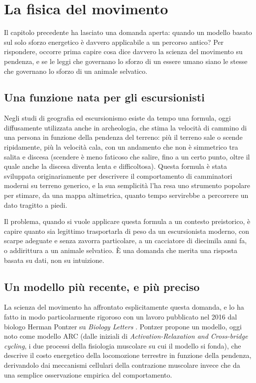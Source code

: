 \chapter{La fisica del movimento}
\label{cap:fisica_movimento}

Il capitolo precedente ha lasciato una domanda aperta: quando un modello basato sul solo sforzo energetico è davvero applicabile a un percorso antico? Per rispondere, occorre prima capire cosa dice davvero la scienza del movimento su pendenza, e se le leggi che governano lo sforzo di un essere umano siano le stesse che governano lo sforzo di un animale selvatico.

\section{Una funzione nata per gli escursionisti}

Negli studi di geografia ed escursionismo esiste da tempo una formula, oggi diffusamente utilizzata anche in archeologia, che stima la velocità di cammino di una persona in funzione della pendenza del terreno: più il terreno sale o scende ripidamente, più la velocità cala, con un andamento che non è simmetrico tra salita e discesa (scendere è meno faticoso che salire, fino a un certo punto, oltre il quale anche la discesa diventa lenta e difficoltosa). Questa formula è stata sviluppata originariamente per descrivere il comportamento di camminatori moderni su terreno generico, e la sua semplicità l'ha resa uno strumento popolare per stimare, da una mappa altimetrica, quanto tempo servirebbe a percorrere un dato tragitto a piedi.

Il problema, quando si vuole applicare questa formula a un contesto preistorico, è capire quanto sia legittimo trasportarla di peso da un escursionista moderno, con scarpe adeguate e senza zavorra particolare, a un cacciatore di diecimila anni fa, o addirittura a un animale selvatico. È una domanda che merita una risposta basata su dati, non su intuizione.

\section{Un modello più recente, e più preciso}

La scienza del movimento ha affrontato esplicitamente questa domanda, e lo ha fatto in modo particolarmente rigoroso con un lavoro pubblicato nel 2016 dal biologo Herman Pontzer su \textit{Biology Letters} \citep{pontzer2016}. Pontzer propone un modello, oggi noto come modello ARC (dalle iniziali di \textit{Activation-Relaxation and Cross-bridge cycling}, i due processi della fisiologia muscolare su cui il modello si fonda), che descrive il costo energetico della locomozione terrestre in funzione della pendenza, derivandolo dai meccanismi cellulari della contrazione muscolare invece che da una semplice osservazione empirica del comportamento.

